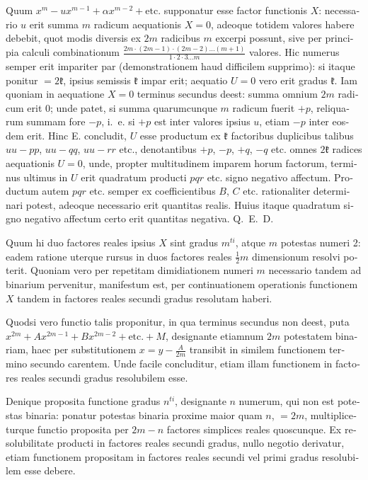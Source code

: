 \documentclass[12pt,a4paper]{article}
\begin{document}
\begin{otherlanguage}{latin}
Quum $x^{m}-ux^{m-1}+\alpha x^{m-2}+\text{etc.}$ supponatur esse factor functionis $X$: necessario $u$ erit summa $m$ radicum aequationis $X=0$, adeoque totidem valores habere debebit, quot modis diversis ex $2m$ radicibus $m$ excerpi possunt, sive per principia calculi combinationum $\frac{2m\cdot(2m-1)\cdot(2m-2)\ldots(m+1)}{1\cdot2\cdot3\ldots m}$ valores. Hic numerus semper erit impariter par (demonstrationem haud difficilem supprimo): si itaque ponitur $=2\mathfrak{k}$, ipsius semissis $\mathfrak{k}$ impar erit; aequatio $U=0$ vero erit gradus $\mathfrak{k}$. Iam quoniam in aequatione $X=0$ terminus secundus deest: summa omnium $2m$ radicum erit $0$; unde patet, si summa quarumcunque $m$ radicum fuerit $+p$, reliquarum summam fore $-p$, i.~e. si $+p$ est inter valores ipsius $u$, etiam $-p$ inter eosdem erit. Hinc E. concludit, $U$ esse productum ex $\mathfrak{k}$ factoribus duplicibus talibus $uu-pp$, $uu-qq$, $uu-rr$ etc., denotantibus $+p$, $-p$, $+q$, $-q$ etc. omnes $2\mathfrak{k}$ radices aequationis $U=0$, unde, propter multitudinem imparem horum factorum, terminus ultimus in $U$ erit quadratum producti $pqr$ etc. signo negativo affectum. Productum autem $pqr$ etc. semper ex coefficientibus $B$, $C$ etc. rationaliter determinari potest, adeoque necessario erit quantitas realis. Huius itaque quadratum signo negativo affectum certo erit quantitas negativa. Q.~E.~D.

Quum hi duo factores reales ipsius $X$ sint gradus $m^{ti}$, atque $m$ potestas numeri 2: eadem ratione uterque rursus in duos factores reales $\tfrac{1}{2}m$ dimensionum resolvi poterit. Quoniam vero per repetitam dimidiationem numeri $m$ necessario tandem ad binarium pervenitur, manifestum est, per continuationem operationis functionem $X$ tandem in factores reales secundi gradus resolutam haberi.

Quodsi vero functio talis proponitur, in qua terminus secundus non deest, puta $x^{2m}+Ax^{2m-1}+Bx^{2m-2}+\text{etc.}+M$, designante etiamnum $2m$ potestatem binariam, haec per substitutionem $x=y-\frac{A}{2m}$ transibit in similem functionem termino secundo carentem. Unde facile concluditur, etiam illam functionem in factores reales secundi gradus resolubilem esse.

Denique proposita functione gradus $n^{ti}$, designante $n$ numerum, qui non est potestas binaria: ponatur potestas binaria proxime maior quam $n$, $=2m$, multipliceturque functio proposita per $2m-n$ factores simplices reales quoscunque. Ex resolubilitate producti in factores reales secundi gradus, nullo negotio derivatur, etiam functionem propositam in factores reales secundi vel primi gradus resolubilem esse debere.


\end{otherlanguage}
\end{document}
